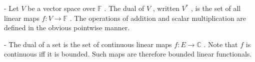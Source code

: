   \par
- Let  $ V $  be a vector space over  $  \mathbb{F} $ . The dual of
 $ V $ , written  $ V^* $ , is the set of all linear maps
 $ f : V \to  \mathbb{F} $ .  The operations of addition and scalar
multiplication are defined in the obvious pointwise manner.

 \par
- The dual of a set is the set of continuous
linear maps  $ f : E \to  \mathbb{C} $ .  Note that  $ f $  is
continuous iff it is bounded. Such maps are therefore bounded
linear functionals.
